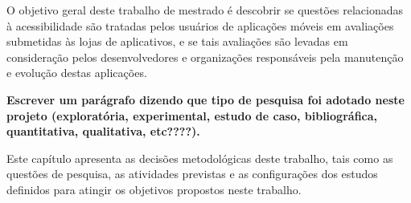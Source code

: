 

O objetivo geral deste trabalho de mestrado é descobrir se questões relacionadas à acessibilidade são tratadas pelos usuários de aplicações móveis em avaliações submetidas às lojas de aplicativos,
e se tais avaliações são levadas em consideração pelos desenvolvedores e organizações responsáveis pela manutenção e evolução destas aplicações.


\textbf{Escrever um parágrafo dizendo que tipo de pesquisa foi adotado neste projeto (exploratória, experimental, estudo de caso, bibliográfica, quantitativa, qualitativa, etc????).}



Este capítulo apresenta as decisões metodológicas deste trabalho, tais como as questões de pesquisa, as atividades previstas e as configurações dos estudos definidos para atingir os objetivos propostos neste trabalho. 

